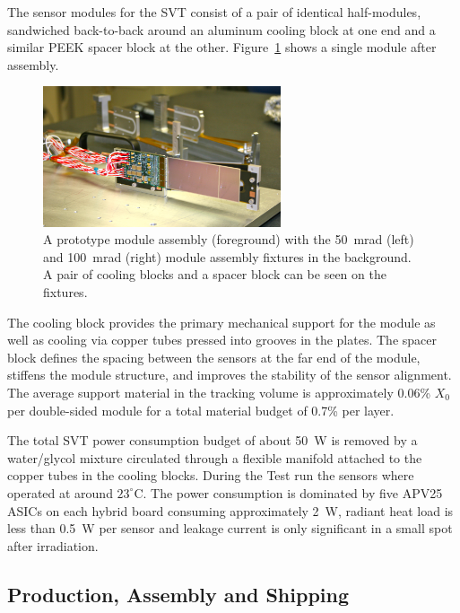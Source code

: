 \documentclass[final,3p,times,twocolumn]{elsarticle}
\begin{document}
The sensor modules for the SVT consist of a pair of identical half-modules, sandwiched back-to-back 
around an aluminum cooling block at one end and a similar PEEK spacer block at the other. 
Figure~\ref{fig:tracker_module} shows a single module after assembly.
\begin{figure}[htp]
	\begin{center}
   	 \includegraphics[width=7cm]{figures/IMG_5200}
	\caption{\small{A prototype module assembly (foreground) with the 50~mrad (left) and 100~mrad (right) module assembly fixtures in the background.  A pair of cooling blocks and a spacer block can be seen on the fixtures.} }
	\label{fig:tracker_module}
	\end{center}
\vspace*{-5mm}
\end{figure}
The cooling block provides the primary mechanical support for the module as well as cooling via copper 
tubes pressed into grooves in the plates. The spacer block defines the spacing between the sensors at 
the far end of the module, stiffens the module structure, and improves the stability of the sensor 
alignment.  The average support material in the tracking volume is approximately 0.06\% $X_{0}$ per 
double-sided module for a total material budget of 0.7\% per layer.

The total SVT power consumption budget of about 50~W is removed by a water/glycol mixture 
circulated through a flexible manifold attached to the copper tubes in the cooling blocks. During the Test 
run the sensors where operated at around $23^{\circ}$C. The power consumption is dominated by five 
APV25 ASICs on each hybrid board consuming approximately 2~W, radiant heat load is less than 
0.5~W per sensor and leakage current is only significant in a small spot after irradiation.  







\subsection{Production, Assembly and Shipping}
\end{document}
